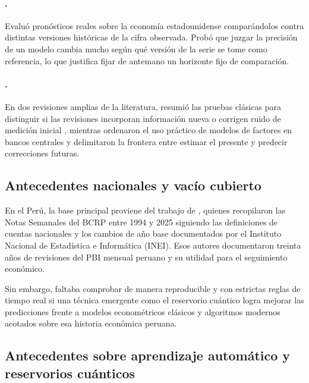 \paragraph{\texorpdfstring{\textcite{stark2010}}{Stark (2010)}.}
Evaluó pronósticos reales sobre la economía estadounidense comparándolos contra distintas versiones históricas de la cifra observada. Probó que juzgar la precisión de un modelo cambia mucho según qué versión de la serie se tome como referencia, lo que justifica fijar de antemano un horizonte fijo de comparación.

\paragraph{\texorpdfstring{\textcite{croushore2011,banbura2011}}{Croushore (2011) y Bańbura et al. (2011)}.}
En dos revisiones amplias de la literatura, \textcite{croushore2011} resumió las pruebas clásicas para distinguir si las revisiones incorporan información nueva o corrigen ruido de medición inicial \parencite{mankiw1986}, mientras \textcite{banbura2011} ordenaron el uso práctico de modelos de factores en bancos centrales y delimitaron la frontera entre estimar el presente y predecir correcciones futuras.

\subsection{Antecedentes nacionales y vacío cubierto}

En el Perú, la base principal proviene del trabajo de \textcite{cruz2025}, quienes recopilaron las Notas Semanales del BCRP entre 1994 y 2025 siguiendo las definiciones de cuentas nacionales y los cambios de año base documentados por el Instituto Nacional de Estadística e Informática (INEI). Esos autores documentaron treinta años de revisiones del PBI mensual peruano y su utilidad para el seguimiento económico.

Sin embargo, faltaba comprobar de manera reproducible y con estrictas reglas de tiempo real si una técnica emergente como el reservorio cuántico logra mejorar las predicciones frente a modelos econométricos clásicos y algoritmos modernos acotados sobre esa historia económica peruana.

\subsection{Antecedentes sobre aprendizaje automático y reservorios cuánticos}

